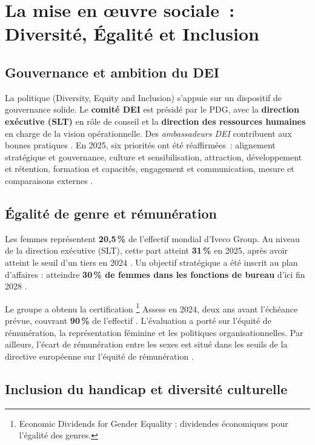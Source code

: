 \section{La mise en \oe{}uvre sociale~: Diversité, Égalité et Inclusion}

\subsection{Gouvernance et ambition du DEI}

La politique  (Diversity, Equity and Inclusion) s'appuie sur un dispositif de gouvernance solide. Le \textbf{comité DEI} est présidé par le PDG, avec la \textbf{direction exécutive (SLT)} en rôle de conseil et la \textbf{direction des ressources humaines} en charge de la vision opérationnelle. Des \textit{ambassadeurs DEI} contribuent aux bonnes pratiques \cite{iveco_annual_2025}. En 2025, six priorités ont été réaffirmées~: alignement stratégique et gouvernance, culture et sensibilisation, attraction, développement et rétention, formation et capacités, engagement et communication, mesure et comparaisons externes \cite{iveco_annual_2025}.

\subsection{Égalité de genre et rémunération}

Les femmes représentent \textbf{20,5\,\%} de l'effectif mondial d'Iveco Group. Au niveau de la direction exécutive (SLT), cette part atteint \textbf{31\,\%} en 2025, après avoir atteint le seuil d'un tiers en 2024 \cite{iveco_annual_2025}. Un objectif stratégique a été inscrit au plan d'affaires : atteindre \textbf{30\,\% de femmes dans les fonctions de bureau} d'ici fin 2028 \cite{iveco_dei_2025}.

Le groupe a obtenu la certification \footnote{Economic Dividends for Gender Equality : dividendes économiques pour l'égalité des genres.} Assess en 2024, deux ans avant l'échéance prévue, couvrant \textbf{90\,\%} de l'effectif \cite{iveco_annual_2025}. L'évaluation a porté sur l'équité de rémunération, la représentation féminine et les politiques organisationnelles. Par ailleurs, l'écart de rémunération entre les sexes est situé dans les seuils de la directive européenne sur l'équité de rémunération \cite{iveco_annual_2025}.

\subsection{Inclusion du handicap et diversité culturelle}

